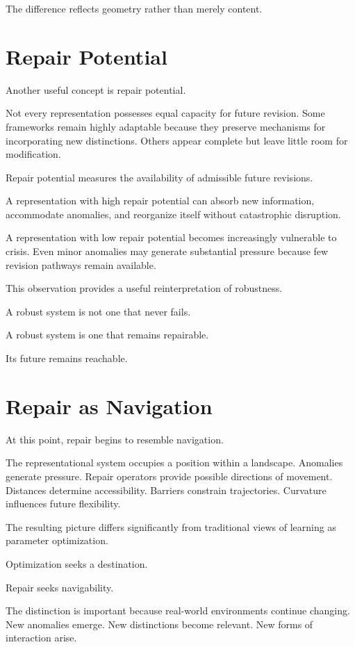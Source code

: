 \documentclass[11pt,oneside,openany]{book}
\begin{document}
The difference reflects geometry rather than merely content.

\section{Repair Potential}

Another useful concept is repair potential.

Not every representation possesses equal capacity for future revision. Some frameworks remain highly adaptable because they preserve mechanisms for incorporating new distinctions. Others appear complete but leave little room for modification.

Repair potential measures the availability of admissible future revisions.

A representation with high repair potential can absorb new information, accommodate anomalies, and reorganize itself without catastrophic disruption.

A representation with low repair potential becomes increasingly vulnerable to crisis. Even minor anomalies may generate substantial pressure because few revision pathways remain available.

This observation provides a useful reinterpretation of robustness.

A robust system is not one that never fails.

A robust system is one that remains repairable.

Its future remains reachable.

\section{Repair as Navigation}

At this point, repair begins to resemble navigation.

The representational system occupies a position within a landscape. Anomalies generate pressure. Repair operators provide possible directions of movement. Distances determine accessibility. Barriers constrain trajectories. Curvature influences future flexibility.

The resulting picture differs significantly from traditional views of learning as parameter optimization.

Optimization seeks a destination.

Repair seeks navigability.

The distinction is important because real-world environments continue changing. New anomalies emerge. New distinctions become relevant. New forms of interaction arise.
\end{document}
